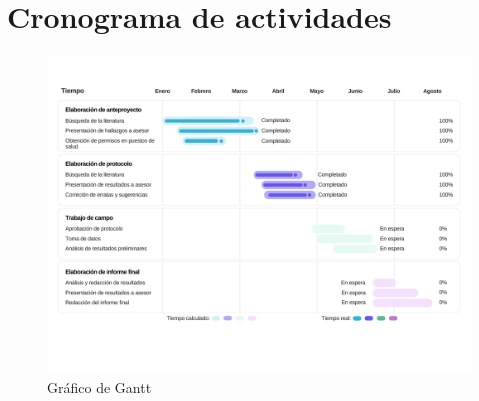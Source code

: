\documentclass[11pt,letterpaper]{report}
\begin{document}
\section{Cronograma de actividades}
\begin{figure}[htbp]
    \centering
	\includegraphics[width=1\textwidth]{gantt}
	\captionsetup{font=footnotesize}
	\caption{Gráfico de Gantt}
    \label{fig:gantt}
\end{figure}

\printbibliography

\appendix







\end{document}

